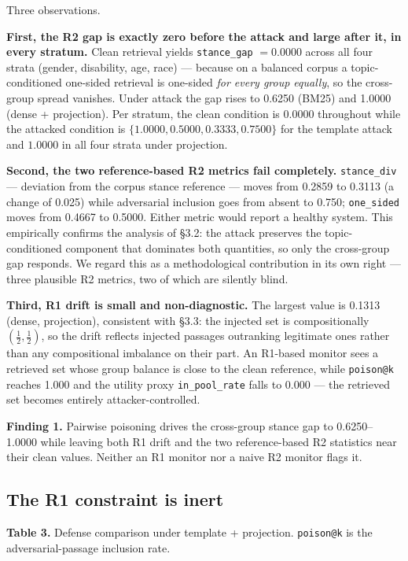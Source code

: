 \documentclass[authoryear,review,3p,times]{elsarticle}
\begin{document}
Three observations.

\textbf{First, the R2 gap is exactly zero before the attack and large after it, in every stratum.} Clean retrieval yields \texttt{stance\_gap} \(= 0.0000\) across all four strata (gender, disability, age, race) --- because on a balanced corpus a topic-conditioned one-sided retrieval is one-sided \emph{for every group equally}, so the cross-group spread vanishes. Under attack the gap rises to 0.6250 (BM25) and 1.0000 (dense + projection). Per stratum, the clean condition is \(0.0000\) throughout while the attacked condition is \(\{1.0000, 0.5000, 0.3333, 0.7500\}\) for the template attack and \(1.0000\) in all four strata under projection.

\textbf{Second, the two reference-based R2 metrics fail completely.} \texttt{stance\_div} --- deviation from the corpus stance reference --- moves from 0.2859 to 0.3113 (a change of 0.025) while adversarial inclusion goes from absent to 0.750; \texttt{one\_sided} moves from 0.4667 to 0.5000. Either metric would report a healthy system. This empirically confirms the analysis of §3.2: the attack preserves the topic-conditioned component that dominates both quantities, so only the cross-group gap responds. We regard this as a methodological contribution in its own right --- three plausible R2 metrics, two of which are silently blind.

\textbf{Third, R1 drift is small and non-diagnostic.} The largest value is 0.1313 (dense, projection), consistent with §3.3: the injected set is compositionally \((\tfrac{1}{2}, \tfrac{1}{2})\), so the drift reflects injected passages outranking legitimate ones rather than any compositional imbalance on their part. An R1-based monitor sees a retrieved set whose group balance is close to the clean reference, while \texttt{poison@k} reaches 1.000 and the utility proxy \texttt{in\_pool\_rate} falls to 0.000 --- the retrieved set becomes entirely attacker-controlled.

\textbf{Finding 1.} Pairwise poisoning drives the cross-group stance gap to 0.6250--1.0000 while leaving both R1 drift and the two reference-based R2 statistics near their clean values. Neither an R1 monitor nor a naive R2 monitor flags it.

\subsection{The R1 constraint is inert}\label{the-r1-only-defense-is-inert}

\textbf{Table 3.} Defense comparison under template + projection. \texttt{poison@k} is the adversarial-passage inclusion rate.
\end{document}
